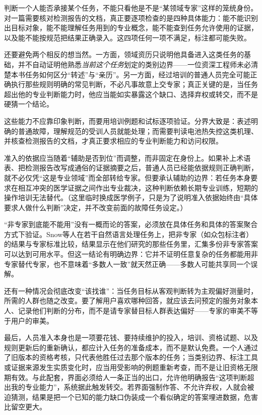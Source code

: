 判断一个人能否承接某个任务，不能只看他是不是“某领域专家”这样的笼统身份。对一篇需要核对检测报告的文档，真正要逐项检查的是四种具体能力：能不能识别出目标对象，能不能理解任务用到的专业概念，能不能查到任务允许使用的证据，以及能不能按规范把结果正确录入。这四项任何一项不满足，标注都可能失败。

还要避免两个相反的想当然。一方面，领域资历只说明他具备进入这类任务的基础，并不自动证明他熟悉\emph{当前这个任务}划定的类别边界——一位资深工程师未必清楚本书任务如何区分“转述”与“亲历”。另一方面，经过培训的普通人员完全可能正确执行那些规则明确的常见判断，不必凡事故意上交专家；真正关键的是，当任务超出他的专业判断能力时，他应当能如实暴露这个缺口、选择弃权或转交，而不是硬猜一个结论。

这些能力不应靠印象判断，而要用培训例题和试标逐项验证。分界大致是：表述明确的普通故障，理解规范的受训人员就能处理；而需要判读电池热失控这类机理、并核查检测报告的文档，才真正要求相应的专业判断能力和访问权限。

准入的依据应当随着“辅助是否到位”而调整，而非固定在身份上。如果补上术语表、把检测报告改写成通俗的证据摘要之后，普通人员已经能依据规则正确判断，就不必仅凭“这是专业领域”而全部转给专家。但要承认辅助的边界：若任务本身要求在相互冲突的医学证据之间作出专业裁决，这种判断依赖长期专业训练，短期的操作培训无法替代。（这里临时换成医学例子，只是为了说明准入依据始终由“具体要求人做什么判断”决定，并不改变前面的故障任务设定。）

“非专家到底能不能用”没有一概而论的答案，必须放在具体任务和具体的答案聚合方式下验证。Snow等人在若干自然语言处理任务上，把非专家（如众包标注者）的结果与专家标准比较，结果显示在他们研究的那些任务里，汇集多份非专家答案可以达到可用水平。但这一结论有明确边界：它并不证明任意复杂的任务都能用非专家替代专家，也不意味着“多数人一致”就天然正确——多数人可能共享同一个误解。

还有一种情况会彻底改变“该找谁”：当任务目标从客观判断转为主观偏好测量时，所需的人群也随之改变。要了解用户喜欢哪种回答，就应该去问预定的服务对象本人、记录他们判断的分布，而不是请专家替目标人群表达偏好——专家的审美不等于用户的审美。

最后，人员准入本身也是一项要花钱、要持续维护的投入，培训、资格试题、以及规则更新后的重新确认，都应计入任务的准备成本，而不是默认免费。一个人通过了旧版本的资格考核，只代表他胜任过去那个版本的任务；当类别边界、标注工具或证据来源发生实质变化时，应当用受影响的例题重新考查，而不是让旧资格无限期有效。与此配套，界面必须给人一条正当的出口，允许他明确报告“这项判断超出我的专业能力”，系统据此触发转交。若界面强制作答、不允许弃权，人就会被迫猜测，结果是把一个已知的能力缺口伪装成一个看似确定的答案埋进数据，危害比留空更大。

